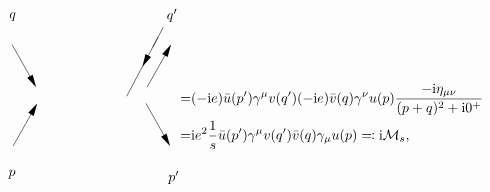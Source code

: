 \begin{equation}
\begin{gathered}
\begin{tikzpicture}[x=0.75pt,y=0.75pt,yscale=-1,xscale=1]
            \draw    (236.58,79.88) -- (206.58,136.21) ;
            \draw [shift={(221.58,108.04)}, rotate = 298.04] [fill={rgb, 255:red, 0; green, 0; blue, 0 }  ][line width=0.08]  [draw opacity=0] (12,-3) -- (0,0) -- (12,3) -- cycle    ;
            \draw    (231.58,89.46) -- (241.58,70.29) ;
            
            \draw    (97,87) -- (119.02,125.93) ;
            \draw [shift={(120,127.67)}, rotate = 240.51] [fill={rgb, 255:red, 0; green, 0; blue, 0 }  ][line width=0.08]  [draw opacity=0] (12,-3) -- (0,0) -- (12,3) -- cycle    ;
            \draw    (98,183.67) -- (120.02,144.74) ;
            \draw [shift={(121,143)}, rotate = 119.49] [fill={rgb, 255:red, 0; green, 0; blue, 0 }  ][line width=0.08]  [draw opacity=0] (12,-3) -- (0,0) -- (12,3) -- cycle    ;
            \draw    (247.02,181.93) -- (225,143) ;
            \draw [shift={(248,183.67)}, rotate = 240.51] [fill={rgb, 255:red, 0; green, 0; blue, 0 }  ][line width=0.08]  [draw opacity=0] (12,-3) -- (0,0) -- (12,3) -- cycle    ;
            \draw    (248.02,88.74) -- (226,127.67) ;
            \draw [shift={(249,87)}, rotate = 119.49] [fill={rgb, 255:red, 0; green, 0; blue, 0 }  ][line width=0.08]  [draw opacity=0] (12,-3) -- (0,0) -- (12,3) -- cycle    ;
            
            \draw (102,65.89) node [anchor=south east] [inner sep=0.75pt]    {$q$};
            \draw (243.58,66.89) node [anchor=south west] [inner sep=0.75pt]    {$q'$};
            \draw (101.58,204.98) node [anchor=north east] [inner sep=0.75pt]    {$p$};
            \draw (245,205.9) node [anchor=north west][inner sep=0.75pt]    {$p'$};
            \end{tikzpicture}            
    \end{gathered}  \begin{aligned}[t]
        =& (- \ii e) \bar{u}(p') \gamma^\mu v(q') (- \ii e) \bar{v}(q) \gamma^\nu u(p) \frac{- \ii \eta_{\mu \nu}}{(p+q)^2 + \ii 0^+} \\
        =& \ii e^2 \frac{1}{s} \bar{u}(p') \gamma^\mu v(q') \bar{v}(q) \gamma_\mu u(p) \eqqcolon \ii \mathcal{M}_s,
    \end{aligned} 
\end{equation}